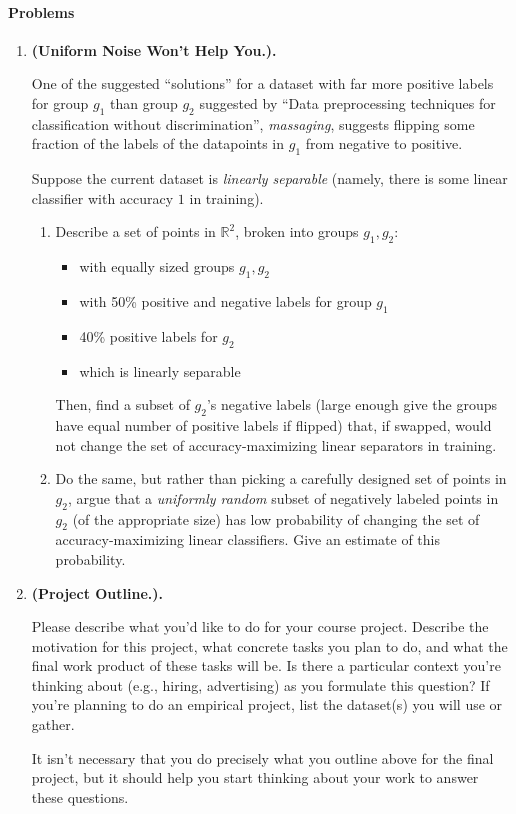 \documentclass{article}
\theoremstyle{plain}
\newcommand{\R}{\mathbb{R}}
\newcommand\litem[1]{\item{\bfseries#1.\space}}
\begin{document}
\paragraph{Problems}
\begin{enumerate}
\litem{(Uniform Noise Won't Help You.)}


One of the suggested ``solutions'' for a dataset with far more
positive labels for group $g_1$ than group $g_2$ suggested by ``Data
preprocessing techniques for classification without discrimination'',
\emph{massaging}, suggests flipping some fraction of the labels of the
datapoints in $g_1$ from negative to positive.

Suppose the current dataset is \emph{linearly separable} (namely,
there is some linear classifier with accuracy $1$ in training).

\begin{enumerate}
\item Describe a set of points in $\R^2$, broken into groups
  $g_1, g_2$:
  \begin{itemize}
    \item with equally sized groups $g_1, g_2$
    \item with 50\% positive and negative labels for group $g_1$
    \item  40\% positive labels for $g_2$
    \item which is linearly separable
    \end{itemize}

    Then, find a subset of $g_2$'s negative labels (large enough give
    the groups have equal number of positive labels if flipped) that,
    if swapped, would not change the set of accuracy-maximizing linear
    separators in training.
  \item Do the same, but rather than picking a carefully designed set
    of points in $g_2$, argue that a \emph{uniformly random} subset of
    negatively labeled points in $g_2$ (of the appropriate size) has
    low probability of changing the set of accuracy-maximizing linear
    classifiers. Give an estimate of this probability.

 
  \end{enumerate}

\litem{(Project Outline.)}

Please describe what you'd like to do for your course
project. Describe the motivation for this project, what concrete tasks
you plan to do, and what the final work product of these tasks will
be. Is there a particular context you're thinking about (e.g., hiring,
advertising) as you formulate this question?  If you're planning to do
an empirical project, list the dataset(s) you will use or gather.

It isn't necessary that you do precisely what you outline above for
the final project, but it should help you start thinking about your
work to answer these questions.
\end{enumerate}
\end{document}
